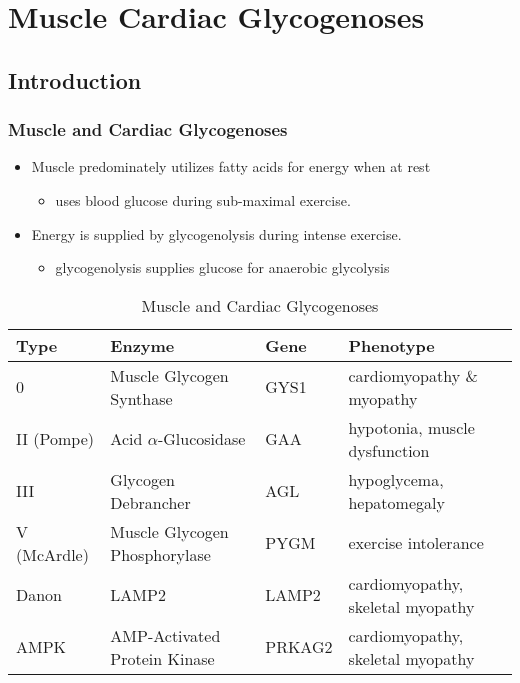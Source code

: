 \documentclass{scrartcl}
\begin{document}
\section{Muscle Cardiac Glycogenoses}
\label{sec:orgd9556b8}
\subsection{Introduction}
\label{sec:org17c4b95}
\subsubsection{Muscle and Cardiac Glycogenoses}
\label{sec:org842f920}

\begin{itemize}
\item Muscle predominately utilizes fatty acids for energy when at rest
\begin{itemize}
\item uses blood glucose during sub-maximal exercise.
\end{itemize}
\item Energy is supplied by glycogenolysis during intense exercise.
\begin{itemize}
\item glycogenolysis supplies glucose for anaerobic glycolysis
\end{itemize}
\end{itemize}

\begin{table}[htbp]
\caption{\label{tab:org155f951}
Muscle and Cardiac Glycogenoses}
\centering
\begin{tabular}{llll}
Type & Enzyme & Gene & Phenotype\\
\hline
0 & Muscle Glycogen Synthase & GYS1 & cardiomyopathy \& myopathy\\
II (Pompe) & Acid \(\alpha\)-Glucosidase & GAA & hypotonia, muscle dysfunction\\
III & Glycogen Debrancher & AGL & hypoglycema, hepatomegaly\\
V (McArdle) & Muscle Glycogen Phosphorylase & PYGM & exercise intolerance\\
Danon & LAMP2 & LAMP2 & cardiomyopathy, \textpm{} skeletal myopathy\\
AMPK & AMP-Activated Protein Kinase & PRKAG2 & cardiomyopathy, \textpm{} skeletal myopathy\\
\end{tabular}
\end{table}
\end{document}
